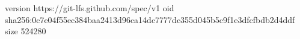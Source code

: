 version https://git-lfs.github.com/spec/v1
oid sha256:0c7e04f55ec384baa2413d96ca14dc7777dc355d045b5c9f1e3dfcfbdb2d4ddf
size 524280
